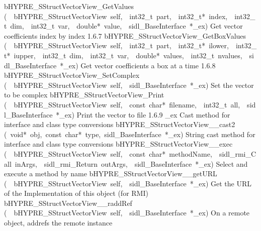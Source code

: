 \documentclass{article}
\begin{document}
\begin{cxxentry}
\begin{cxxentry}
\begin{cxxnames}
        {}
\label{cxx.1.6.12}
        {bHYPRE\_SStructVectorView\_GetValues}
        {(\ \ bHYPRE\_SStructVectorView\ self,\ \ int32\_t\ part,\ \ int32\_t*\ index,\ \ int32\_t\ dim,\ \ int32\_t\ var,\ \ double*\ value,\ \ sidl\_BaseInterface\ *\_ex)}
        {
Get vector coefficients index by index}
        {1.6.7}
        {bHYPRE\_SStructVectorView\_GetBoxValues}
        {(\ \ bHYPRE\_SStructVectorView\ self,\ \ int32\_t\ part,\ \ int32\_t*\ ilower,\ \ int32\_t*\ iupper,\ \ int32\_t\ dim,\ \ int32\_t\ var,\ \ double*\ values,\ \ int32\_t\ nvalues,\ \ sidl\_BaseInterface\ *\_ex)}
        {
Get vector coefficients a box at a time}
        {1.6.8}
        {bHYPRE\_SStructVectorView\_SetComplex}
        {(\ \ bHYPRE\_SStructVectorView\ self,\ \ sidl\_BaseInterface\ *\_ex)}
        {
Set the vector to be complex}
        {}
\label{cxx.1.6.13}
        {bHYPRE\_SStructVectorView\_Print}
        {(\ \ bHYPRE\_SStructVectorView\ self,\ \ const\ char*\ filename,\ \ int32\_t\ all,\ \ sidl\_BaseInterface\ *\_ex)}
        {
Print the vector to file}
        {1.6.9}
        {\_ex}
        {}
        {
Cast method for interface and class type conversions}
        {}
\label{cxx.1.6.14}
        {bHYPRE\_SStructVectorView\_\_cast2}
        {(\ void*\ obj,\ const\ char*\ type,\ sidl\_BaseInterface\ *\_ex)}
        {
String cast method for interface and class type conversions}
        {}
\label{cxx.1.6.15}
        {bHYPRE\_SStructVectorView\_\_exec}
        {(\ \ bHYPRE\_SStructVectorView\ self,\ \ const\ char*\ methodName,\ \ sidl\_rmi\_Call\ inArgs,\ \ sidl\_rmi\_Return\ outArgs,\ \ sidl\_BaseInterface\ *\_ex)}
        {
Select and execute a method by name}
        {}
\label{cxx.1.6.16}
        {bHYPRE\_SStructVectorView\_\_getURL}
        {(\ \ bHYPRE\_SStructVectorView\ self,\ \ sidl\_BaseInterface\ *\_ex)}
        {
Get the URL of the Implementation of this object (for RMI)}
        {}
\label{cxx.1.6.17}
        {bHYPRE\_SStructVectorView\_\_raddRef}
        {(\ \ bHYPRE\_SStructVectorView\ self,\ \ sidl\_BaseInterface\ *\_ex)}
        {
On a remote object, addrefs the remote instance}
        {}
\label{cxx.1.6.18}

\end{cxxnames}
\end{cxxentry}
\end{cxxentry}
\end{document}
